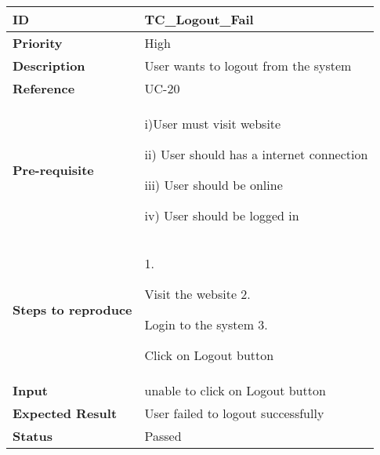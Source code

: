 \begin{center}
    \begin{tabularx}{\textwidth}{|l|X|}
        \hline
        \textbf{ID}                 & TC\_Logout\_Fail                     \\
        \hline
        \textbf{Priority}           & High                                 \\
        \hline
        \textbf{Description}        & User wants to logout from the system \\
        \hline
        \textbf{Reference}          & UC-20                                \\
        \hline
        \textbf{Pre-requisite}      & i)User must visit website

        ii) User should has a internet connection

        iii) User should be online

        iv) User should be logged in                                       \\
        \hline
        \textbf{Steps to reproduce} & 1.

        Visit the website 2.

        Login to the system 3.

        Click on Logout button                                             \\
        \hline
        \textbf{Input}              & unable to click on Logout button     \\
        \hline
        \textbf{Expected Result}    & User failed to logout successfully   \\
        \hline
        \textbf{Status}             & Passed                               \\
        \hline
    \end{tabularx}
\end{center}
\newpage


